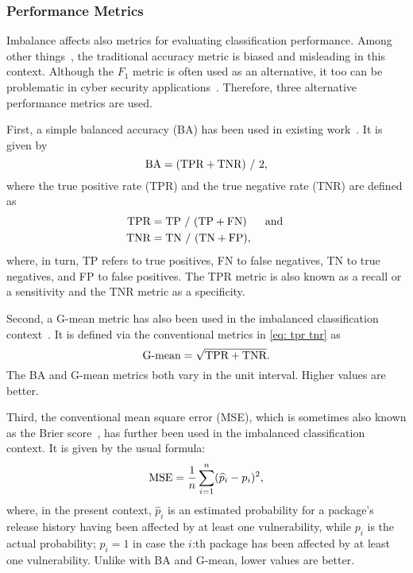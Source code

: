 \documentclass[5p, twocolumn, numbers, sort]{elsarticle}
\begin{document}

\subsubsection{Performance Metrics}\label{subsec: performance metrics}

Imbalance affects also metrics for evaluating classification performance. Among
other things~\cite{Menardi14}, the traditional accuracy metric is biased and
misleading in this context. Although the $F_1$ metric is often used as an
alternative, it too can be problematic in cyber security
applications~\cite{Marwah24}. Therefore, three alternative performance metrics
are used.

First, a simple balanced accuracy (BA) has been used in existing
work~\cite{Brodersen10}. It is given by
%
\begin{equation}
\textmd{BA} = (\textmd{TPR} + \textmd{TNR})~/~2 ,
\end{equation}
%
where the true positive rate (TPR) and the true negative rate (TNR) are defined as
%
\begin{align}\label{eq: tpr tnr}
\textmd{TPR} &= \textmd{TP}~/~(\textmd{TP} + \textmd{FN})
%
~~~~~\textmd{and}~\\
%
\textmd{TNR} &= \textmd{TN}~/~(\textmd{TN} + \textmd{FP}) ,
\end{align}
%
where, in turn, TP refers to true positives, FN to false negatives, TN to true
negatives, and FP to false positives. The TPR metric is also known as a recall
or a sensitivity and the TNR metric as a specificity.

Second, a G-mean metric has also been used in the imbalanced classification
context~\cite{Kaleeswari23, Susan20}. It is defined via the conventional metrics
in \eqref{eq: tpr tnr} as
%
\begin{equation}
\textmd{G-mean} = \sqrt{\textmd{TPR} + \textmd{TNR}} .
\end{equation}
%
The BA and G-mean metrics both vary in the unit interval. Higher values are
better.

Third, the conventional mean square error (MSE), which is sometimes also known
as the Brier score~\cite{Kaleeswari23}, has further been used in the imbalanced
classification context. It is given by the usual formula:
%
\begin{equation}
\textmd{MSE} = \frac{1}{n}\sum^n_{i=1} (\widehat{p}_i - p_i)^2 ,
\end{equation}
%
where, in the present context, $\widehat{p}_i$ is an estimated probability for a
package's release history having been affected by at least one vulnerability,
while $p_i$ is the actual probability; $p_i = 1$ in case the $i$:th package has
been affected by at least one vulnerability. Unlike with BA and G-mean, lower
values are better.
\end{document}
